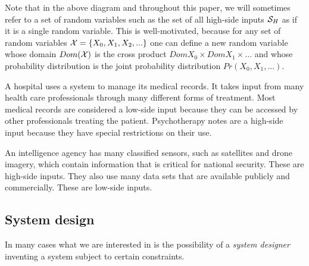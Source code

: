 \documentclass[../thesis.tex]{subfiles}
\begin{document}
\begin{center}
\end{center}

Note that in the above diagram and throughout this paper,
we will sometimes refer to a set of random variables
such as the set of all high-side inputs $\mathcal{S}_H$
as if it is a single random variable.
This is well-motivated, because for any set of random
variables $\mathcal{X} = \{X_0, X_1, X_2, ...\}$
one can define a new random variable
whose domain $Dom(\mathcal{X})$ is the cross product
$Dom{X_0} \times Dom{X_1} \times ...$ and whose
probability distribution is the joint probability
distribution $Pr(X_0, X_1, ...)$.

\begin{exm}
  A hospital uses a system to manage its medical records.
  It takes input from many health care professionals through
  many different forms of treatment.
  Most medical records are considered a low-side input
  because they can be accessed by other professionals
  treating the patient.
  Psychotherapy notes are a high-side input because they
  have special restrictions on their use.
\end{exm}

\begin{exm}
  An intelligence agency has many classified sensors,
  such as satellites and drone imagery, which contain information
  that is critical for national security.
  These are high-side inputs.
  They also use many data sets that are available publicly
  and commercially.
  These are low-side inputs.
\end{exm}

\subsection{System design}
\label{sec:design}

In many cases what we are interested in is the possibility
of a \emph{system designer} inventing a system subject
to certain constraints.
\end{document}
